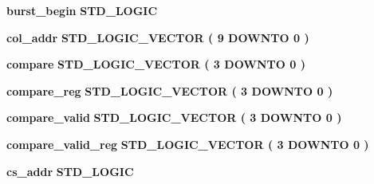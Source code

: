 \begin{DoxyCompactItemize}
\item 
{\bf burst\+\_\+begin} {\bfseries \textcolor{comment}{S\+T\+D\+\_\+\+L\+O\+G\+IC}\textcolor{vhdlchar}{ }} 
\item 
{\bf col\+\_\+addr} {\bfseries \textcolor{comment}{S\+T\+D\+\_\+\+L\+O\+G\+I\+C\+\_\+\+V\+E\+C\+T\+OR}\textcolor{vhdlchar}{ }\textcolor{vhdlchar}{(}\textcolor{vhdlchar}{ }\textcolor{vhdlchar}{ } \textcolor{vhdldigit}{9} \textcolor{vhdlchar}{ }\textcolor{keywordflow}{D\+O\+W\+N\+TO}\textcolor{vhdlchar}{ }\textcolor{vhdlchar}{ } \textcolor{vhdldigit}{0} \textcolor{vhdlchar}{ }\textcolor{vhdlchar}{)}\textcolor{vhdlchar}{ }} 
\item 
{\bf compare} {\bfseries \textcolor{comment}{S\+T\+D\+\_\+\+L\+O\+G\+I\+C\+\_\+\+V\+E\+C\+T\+OR}\textcolor{vhdlchar}{ }\textcolor{vhdlchar}{(}\textcolor{vhdlchar}{ }\textcolor{vhdlchar}{ } \textcolor{vhdldigit}{3} \textcolor{vhdlchar}{ }\textcolor{keywordflow}{D\+O\+W\+N\+TO}\textcolor{vhdlchar}{ }\textcolor{vhdlchar}{ } \textcolor{vhdldigit}{0} \textcolor{vhdlchar}{ }\textcolor{vhdlchar}{)}\textcolor{vhdlchar}{ }} 
\item 
{\bf compare\+\_\+reg} {\bfseries \textcolor{comment}{S\+T\+D\+\_\+\+L\+O\+G\+I\+C\+\_\+\+V\+E\+C\+T\+OR}\textcolor{vhdlchar}{ }\textcolor{vhdlchar}{(}\textcolor{vhdlchar}{ }\textcolor{vhdlchar}{ } \textcolor{vhdldigit}{3} \textcolor{vhdlchar}{ }\textcolor{keywordflow}{D\+O\+W\+N\+TO}\textcolor{vhdlchar}{ }\textcolor{vhdlchar}{ } \textcolor{vhdldigit}{0} \textcolor{vhdlchar}{ }\textcolor{vhdlchar}{)}\textcolor{vhdlchar}{ }} 
\item 
{\bf compare\+\_\+valid} {\bfseries \textcolor{comment}{S\+T\+D\+\_\+\+L\+O\+G\+I\+C\+\_\+\+V\+E\+C\+T\+OR}\textcolor{vhdlchar}{ }\textcolor{vhdlchar}{(}\textcolor{vhdlchar}{ }\textcolor{vhdlchar}{ } \textcolor{vhdldigit}{3} \textcolor{vhdlchar}{ }\textcolor{keywordflow}{D\+O\+W\+N\+TO}\textcolor{vhdlchar}{ }\textcolor{vhdlchar}{ } \textcolor{vhdldigit}{0} \textcolor{vhdlchar}{ }\textcolor{vhdlchar}{)}\textcolor{vhdlchar}{ }} 
\item 
{\bf compare\+\_\+valid\+\_\+reg} {\bfseries \textcolor{comment}{S\+T\+D\+\_\+\+L\+O\+G\+I\+C\+\_\+\+V\+E\+C\+T\+OR}\textcolor{vhdlchar}{ }\textcolor{vhdlchar}{(}\textcolor{vhdlchar}{ }\textcolor{vhdlchar}{ } \textcolor{vhdldigit}{3} \textcolor{vhdlchar}{ }\textcolor{keywordflow}{D\+O\+W\+N\+TO}\textcolor{vhdlchar}{ }\textcolor{vhdlchar}{ } \textcolor{vhdldigit}{0} \textcolor{vhdlchar}{ }\textcolor{vhdlchar}{)}\textcolor{vhdlchar}{ }} 
\item 
{\bf cs\+\_\+addr} {\bfseries \textcolor{comment}{S\+T\+D\+\_\+\+L\+O\+G\+IC}\textcolor{vhdlchar}{ }} 

\end{DoxyCompactItemize}
